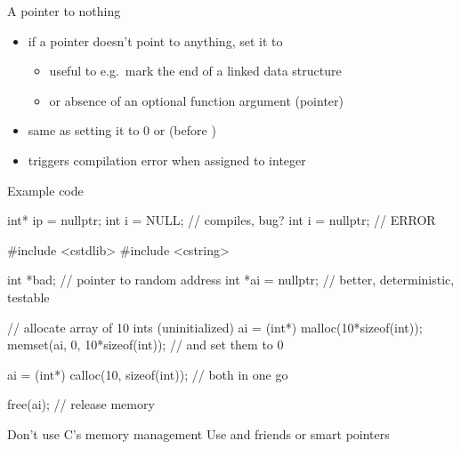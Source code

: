 \begin{frame}[fragile]
  \begin{block}{A pointer to nothing}
    \begin{itemize}
    \item if a pointer doesn't point to anything, set it to 
    \begin{itemize}
      \item useful to e.g.\ mark the end of a linked data structure
      \item or absence of an optional function argument (pointer)
    \end{itemize}
    \item same as setting it to 0 or  (before )
    \item triggers compilation error when assigned to integer
    \end{itemize}
  \end{block}
  \pause
  \begin{exampleblock}{Example code}
    \begin{cppcode*}{}
      int* ip = nullptr;
      int i = NULL;      // compiles, bug?
      int i = nullptr;   // ERROR
    \end{cppcode*}
  \end{exampleblock}
\end{frame}

\begin{frame}[fragile]
  \begin{cppcode}
    #include <cstdlib>
    #include <cstring>

    int *bad;          // pointer to random address
    int *ai = nullptr; // better, deterministic, testable

    // allocate array of 10 ints (uninitialized)
    ai = (int*) malloc(10*sizeof(int));
    memset(ai, 0, 10*sizeof(int)); // and set them to 0

    ai = (int*) calloc(10, sizeof(int)); // both in one go

    free(ai); // release memory
  \end{cppcode}
  \begin{goodpractice}{Don't use C's memory management}
    Use  and friends or smart pointers
  \end{goodpractice}
\end{frame}

